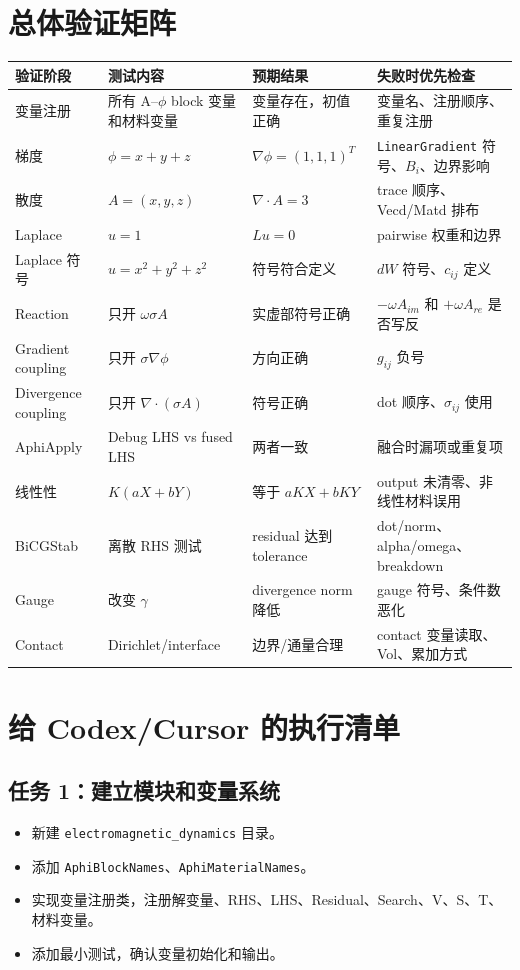 \documentclass[UTF8,a4paper,11pt]{ctexart}
\newcommand{\code}[1]{\texttt{#1}}
\begin{document}
\section{总体验证矩阵}

\begin{longtable}{p{}p{}p{}p{}}
\toprule
验证阶段 & 测试内容 & 预期结果 & 失败时优先检查 \\
\midrule
变量注册 & 所有 A--$\phi$ block 变量和材料变量 & 变量存在，初值正确 & 变量名、注册顺序、重复注册 \\
梯度 & $\phi=x+y+z$ & $\nabla\phi=(1,1,1)^T$ & \code{LinearGradient} 符号、$B_i$、边界影响 \\
散度 & $A=(x,y,z)$ & $\nabla\cdot A=3$ & trace 顺序、Vecd/Matd 排布 \\
Laplace & $u=1$ & $Lu=0$ & pairwise 权重和边界 \\
Laplace 符号 & $u=x^2+y^2+z^2$ & 符号符合定义 & $dW$ 符号、$c_{ij}$ 定义 \\
Reaction & 只开 $\omega\sigma A$ & 实虚部符号正确 & $-\omega A_{im}$ 和 $+\omega A_{re}$ 是否写反 \\
Gradient coupling & 只开 $\sigma\nabla\phi$ & 方向正确 & $g_{ij}$ 负号 \\
Divergence coupling & 只开 $\nabla\cdot(\sigma A)$ & 符号正确 & dot 顺序、$\sigma_{ij}$ 使用 \\
AphiApply & Debug LHS vs fused LHS & 两者一致 & 融合时漏项或重复项 \\
线性性 & $K(aX+bY)$ & 等于 $aKX+bKY$ & output 未清零、非线性材料误用 \\
BiCGStab & 离散 RHS 测试 & residual 达到 tolerance & dot/norm、alpha/omega、breakdown \\
Gauge & 改变 $\gamma$ & divergence norm 降低 & gauge 符号、条件数恶化 \\
Contact & Dirichlet/interface & 边界/通量合理 & contact 变量读取、Vol、累加方式 \\
\bottomrule
\end{longtable}

\section{给 Codex/Cursor 的执行清单}

\subsection*{任务 1：建立模块和变量系统}
\begin{itemize}
  \item 新建 \code{electromagnetic\_dynamics} 目录。
  \item 添加 \code{AphiBlockNames}、\code{AphiMaterialNames}。
  \item 实现变量注册类，注册解变量、RHS、LHS、Residual、Search、V、S、T、材料变量。
  \item 添加最小测试，确认变量初始化和输出。
\end{itemize}
\end{document}
